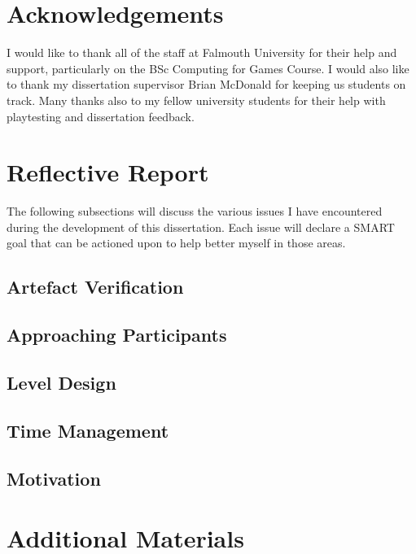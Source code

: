 \documentclass[journal]{IEEEtran}
\begin{document}
\section{Acknowledgements}
I would like to thank all of the staff at Falmouth University for their help and support, particularly on the BSc Computing for Games Course. I would also like to thank my dissertation supervisor Brian McDonald for keeping us students on track. Many thanks also to my fellow university students for their help with playtesting and dissertation feedback.

\newpage



\newpage
\appendices


\section{Reflective Report}
The following subsections will discuss the various issues I have encountered during the development of this dissertation. Each issue will declare a SMART goal that can be actioned upon to help better myself in those areas.

\subsection{Artefact Verification}

\subsection{Approaching Participants}

\subsection{Level Design}

\subsection{Time Management}

\subsection{Motivation}

\section{Additional Materials}
\end{document}
